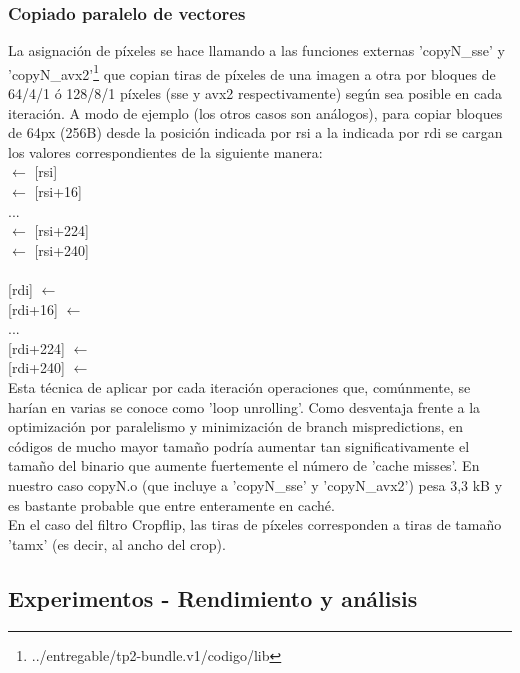\subsubsection{Copiado paralelo de vectores}
\label{explicacionCopyN}

La asignación de píxeles se hace llamando a las funciones externas 'copyN_sse' y 'copyN_avx2'\footnote{../entregable/tp2-bundle.v1/codigo/lib} que copian tiras de píxeles de una imagen a otra por bloques de 64/4/1 ó 128/8/1 píxeles (sse y avx2 respectivamente) según sea posible en cada iteración. A modo de ejemplo (los otros casos son análogos), para copiar bloques de 64px (256B) desde la posición indicada por rsi a la indicada por rdi se cargan los valores correspondientes de la siguiente manera:
\newline
\\
 $\leftarrow$ {[rsi]} \\
 $\leftarrow$ {[rsi+16]} \\
... \\
 $\leftarrow$ {[rsi+224]}  \\
 $\leftarrow$ {[rsi+240]} \\
\\
{[rdi]} $\leftarrow$  \\
{[rdi+16]} $\leftarrow$  \\
... \\
{[rdi+224]} $\leftarrow$  \\
{[rdi+240]} $\leftarrow$  \\

Esta técnica de aplicar por cada iteración operaciones que, comúnmente, se harían en varias se conoce como 'loop unrolling'. Como desventaja frente a la optimización por paralelismo y minimización de branch mispredictions, en códigos de mucho mayor tamaño podría aumentar tan significativamente el tamaño del binario que aumente fuertemente el número de 'cache misses'. En nuestro caso copyN.o (que incluye a 'copyN_sse' y 'copyN_avx2') pesa 3,3 kB y es bastante probable que entre enteramente en caché.
\\

En el caso del filtro Cropflip, las tiras de píxeles corresponden a tiras de tamaño 'tamx' (es decir, al ancho del crop).
\\

\subsection{Experimentos - Rendimiento y análisis}


